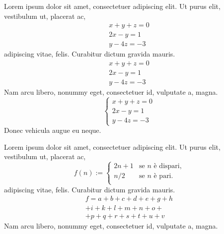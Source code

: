 \documentclass[a4paper,12pt]{article}
\begin{document}

Lorem ipsum dolor sit amet, consectetuer adipiscing elit. Ut purus elit, vestibulum ut, placerat ac, 
\begin{displaymath} 
	\begin{array}{l}
		x+y+z=0\\
		2x-y=1\\
		y-4z=-3 
	\end{array} 
\end{displaymath} 
adipiscing vitae, felis. Curabitur dictum gravida mauris.
\begin{equation}
	\begin{array}{l}
		x+y+z=0\\
		2x-y=1\\
		y-4z=-3 
	\end{array} 
\end{equation}
Nam arcu libero, nonummy eget, consectetuer id, vulputate a, magna.
\begin{equation} 
\left\{
	\begin{array}{l}
	x+y+z=0\\
	2x-y=1\\
	y-4z=-3 
	\end{array} 
\right. 
\end{equation} 
Donec vehicula augue eu neque.


 
 Lorem ipsum dolor sit amet, consectetuer adipiscing elit. Ut purus elit, vestibulum ut, placerat ac, 
 \begin{displaymath}
 f(n):=
 	\begin{cases} 
 	2n+1 & \text{se $n$ è dispari,}\\ 
 	n/2  & \text{se $n$ è pari.} \\
 	\end{cases}
 \end{displaymath}
 adipiscing vitae, felis. Curabitur dictum gravida mauris.
 \begin{multline} 
 	f=a+b+c+d+e+g+h \\ 
 	+i+k+l+m+n+o+\\ 
 	+p+q+r+s+t+u+v 
 \end{multline} 
 Nam arcu libero, nonummy eget, consectetuer id, vulputate a, magna.
\end{document}
